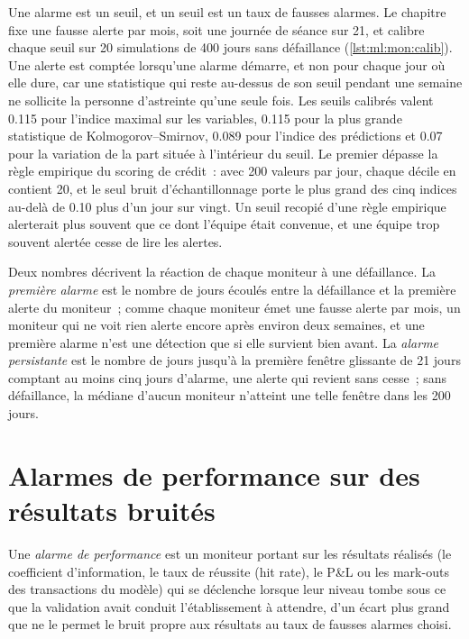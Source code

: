 Une alarme est un seuil, et un seuil est un taux de fausses alarmes. Le chapitre fixe une fausse alerte par mois, soit une journée de séance sur 21,
et calibre chaque seuil sur 20 simulations de 400 jours sans défaillance (\cref{lst:ml:mon:calib}). Une alerte est comptée lorsqu'une alarme
démarre, et non pour chaque jour où elle dure, car une statistique qui reste au-dessus de son seuil pendant une semaine ne sollicite la personne d'astreinte qu'une seule fois.
Les seuils calibrés valent 0.115 pour l'indice maximal sur les variables, 0.115 pour la plus grande statistique de Kolmogorov--Smirnov, 0.089
pour l'indice des prédictions et 0.07 pour la variation de la part située à l'intérieur du seuil. Le premier dépasse la règle empirique du
scoring de crédit~: avec 200 valeurs par jour, chaque décile en contient 20, et le seul bruit d'échantillonnage porte le plus grand des cinq indices au-delà de
0.10 plus d'un jour sur vingt. Un seuil recopié d'une règle empirique alerterait plus souvent que ce dont l'équipe était convenue, et
une équipe trop souvent alertée cesse de lire les alertes.

Deux nombres décrivent la réaction de chaque moniteur à une défaillance. La \emph{première alarme} est le nombre de jours écoulés entre la défaillance et la
première alerte du moniteur~; comme chaque moniteur émet une fausse alerte par mois, un moniteur qui ne voit rien alerte encore après environ deux
semaines, et une première alarme n'est une détection que si elle survient bien avant. La \emph{alarme persistante} est le nombre de jours
jusqu'à la première fenêtre glissante de 21 jours comptant au moins cinq jours d'alarme, une alerte qui revient sans cesse~; sans défaillance, la médiane
d'aucun moniteur n'atteint une telle fenêtre dans les 200 jours.

\section{Alarmes de performance sur des résultats bruités}

\begin{definition}\label{def:ml:monitoring-and-retraining:performance-alarm}
Une \emph{alarme de performance} est un moniteur portant sur les résultats réalisés (le coefficient d'information, le taux de réussite (hit rate),
le P\&L ou les mark-outs des transactions du modèle) qui se déclenche lorsque leur niveau tombe sous ce que la validation avait conduit l'établissement à attendre, d'un écart plus grand
que ne le permet le bruit propre aux résultats au taux de fausses alarmes choisi.
\end{definition}

